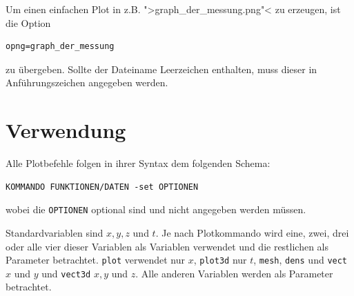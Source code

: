 \documentclass[DIV=14,headsepline,footsepline]{scrbook}
\begin{document}
				Um einen einfachen Plot in z.B. ">graph\_der\_messung.png"< zu erzeugen, ist die Option
				\begin{lstlisting}
opng=graph_der_messung
				\end{lstlisting}
				zu übergeben. Sollte der Dateiname Leerzeichen enthalten, muss dieser in Anführungszeichen angegeben werden.
				
			\section{Verwendung}
				Alle Plotbefehle folgen in ihrer Syntax dem folgenden Schema:
				\begin{lstlisting}
KOMMANDO FUNKTIONEN/DATEN -set OPTIONEN
				\end{lstlisting}
				wobei die \verb+OPTIONEN+ optional sind und nicht angegeben werden müssen.
				
				Standardvariablen sind $x, y, z$ und $t$. Je nach Plotkommando wird eine, zwei, drei oder alle vier dieser Variablen als Variablen verwendet und die restlichen als Parameter betrachtet. \verb+plot+ verwendet nur $x$, \verb+plot3d+ nur $t$, \verb+mesh+, \verb+dens+ und \verb+vect+ $x$ und $y$ und \verb+vect3d+ $x,y$ und $z$. Alle anderen Variablen werden als Parameter betrachtet.
				
\end{document}
